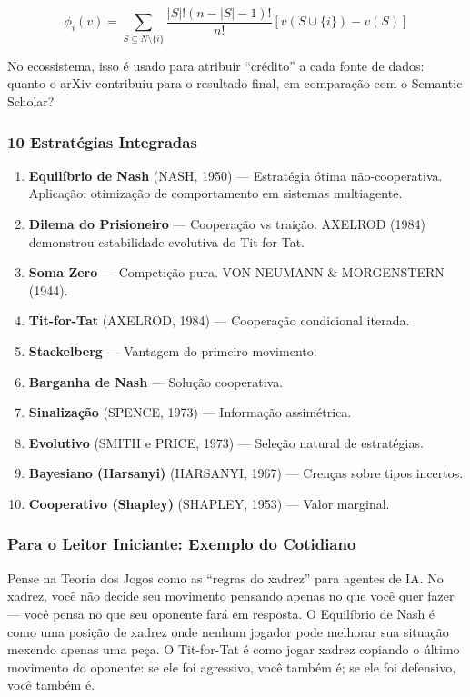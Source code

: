 \documentclass[12pt,a4paper]{article}
\begin{document}
\begin{equation}
  \phi_i(v) = \sum_{S \subseteq N \setminus \{i\}} \frac{|S|!(n-|S|-1)!}{n!}[v(S \cup \{i\}) - v(S)]
\end{equation}

No ecossistema, isso é usado para atribuir ``crédito'' a cada fonte de dados: quanto o arXiv contribuiu para o resultado final, em comparação com o Semantic Scholar?

\subsubsection{10 Estratégias Integradas}

\begin{enumerate}[itemsep=1pt]
  \item \textbf{Equilíbrio de Nash} (NASH, 1950) --- Estratégia ótima não-cooperativa. Aplicação: otimização de comportamento em sistemas multiagente.
  \item \textbf{Dilema do Prisioneiro} --- Cooperação vs traição. AXELROD (1984) demonstrou estabilidade evolutiva do Tit-for-Tat.
  \item \textbf{Soma Zero} --- Competição pura. VON NEUMANN \& MORGENSTERN (1944).
  \item \textbf{Tit-for-Tat} (AXELROD, 1984) --- Cooperação condicional iterada.
  \item \textbf{Stackelberg} --- Vantagem do primeiro movimento.
  \item \textbf{Barganha de Nash} --- Solução cooperativa.
  \item \textbf{Sinalização} (SPENCE, 1973) --- Informação assimétrica.
  \item \textbf{Evolutivo} (SMITH e PRICE, 1973) --- Seleção natural de estratégias.
  \item \textbf{Bayesiano (Harsanyi)} (HARSANYI, 1967) --- Crenças sobre tipos incertos.
  \item \textbf{Cooperativo (Shapley)} (SHAPLEY, 1953) --- Valor marginal.
\end{enumerate}

\subsubsection{Para o Leitor Iniciante: Exemplo do Cotidiano}

Pense na Teoria dos Jogos como as ``regras do xadrez'' para agentes de IA. No xadrez, você não decide seu movimento pensando apenas no que você quer fazer --- você pensa no que seu oponente fará em resposta. O Equilíbrio de Nash é como uma posição de xadrez onde nenhum jogador pode melhorar sua situação mexendo apenas uma peça. O Tit-for-Tat é como jogar xadrez copiando o último movimento do oponente: se ele foi agressivo, você também é; se ele foi defensivo, você também é.
\end{document}
